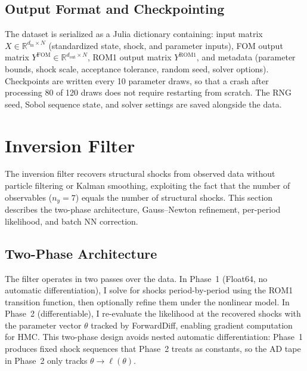 \documentclass[12pt]{article}
\theoremstyle{plain}
\theoremstyle{definition}
\theoremstyle{remark}
\newcommand{\R}{\mathbb{R}}
\begin{document}
\subsection{Output Format and Checkpointing}

The dataset is serialized as a Julia dictionary containing: input matrix $X \in \R^{d_{\text{in}} \times N}$ (standardized state, shock, and parameter inputs), FOM output matrix $Y^{\text{FOM}} \in \R^{d_{\text{out}} \times N}$, ROM1 output matrix $Y^{\text{ROM1}}$, and metadata (parameter bounds, shock scale, acceptance tolerance, random seed, solver options). Checkpoints are written every 10 parameter draws, so that a crash after processing 80 of 120 draws does not require restarting from scratch. The RNG seed, Sobol sequence state, and solver settings are saved alongside the data.


\section{Inversion Filter}
\label{app:inversion}

The inversion filter recovers structural shocks from observed data without particle filtering or Kalman smoothing, exploiting the fact that the number of observables ($n_y = 7$) equals the number of structural shocks. This section describes the two-phase architecture, Gauss--Newton refinement, per-period likelihood, and batch NN correction.


\subsection{Two-Phase Architecture}

The filter operates in two passes over the data. In Phase~1 (Float64, no automatic differentiation), I solve for shocks period-by-period using the ROM1 transition function, then optionally refine them under the nonlinear model. In Phase~2 (differentiable), I re-evaluate the likelihood at the recovered shocks with the parameter vector $\theta$ tracked by ForwardDiff, enabling gradient computation for HMC. This two-phase design avoids nested automatic differentiation: Phase~1 produces fixed shock sequences that Phase~2 treats as constants, so the AD tape in Phase~2 only tracks $\theta \to \ell(\theta)$.
\end{document}
